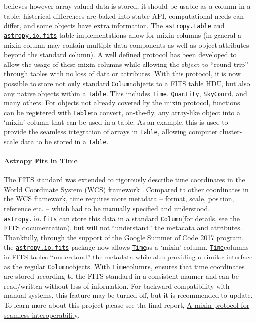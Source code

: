 \documentclass[modern]{aastex631}
\newcommand{\astropysubpkg}[1]{\href{http://docs.astropy.org/en/stable/#1/index.html}{\texttt{astropy.#1}}\xspace}
\newcommand{\astropyiosubpkg}[1]{\href{http://docs.astropy.org/en/stable/io/#1/index.html}{\texttt{astropy.io.#1}}\xspace}
\newcommand{\astropytable}{\astropysubpkg{table}}
\newcommand{\astropyfits}{\astropyiosubpkg{fits}}
\newcommand{\astropyapi}[2]{\href{https://docs.astropy.org/en/stable/api/astropy.#1.html}{#2}}
\newcommand{\astropyapidoc}[2]{\astropyapi{#1}{\texttt{#2}\xspace}}
\newcommand{\astropySkyCoord}{\astropyapidoc{coordinates.SkyCoord}{SkyCoord}}
\newcommand{\astropyFitsColumn}{\astropyapidoc{io.fits.Column}{Column}}
\newcommand{\astropyTableColumn}{\astropyapidoc{table.Column}{Column}}
\newcommand{\astropyTable}{\astropyapidoc{table.Table}{Table}}
\newcommand{\astropyTime}{\astropyapidoc{time.Time}{Time}}
\newcommand{\astropyQuantity}{\astropyapidoc{units.Quantity}{Quantity}}
\begin{document}
    \astropy believes however array-valued data is stored, it should be usable
    as a column in a table: historical differences are baked into stable API,
    computational needs can differ, and some objects have extra information. The
    \astropytable and \astropyfits table implementations allow for mixin-columns
    (in general a mixin column may contain multiple data components as well as
    object attributes beyond the standard column). A well defined protocol has
    been developed to allow the usage of these mixin columns while allowing the
    object to ``round-trip'' through tables with no loss of data or attributes.
    With this protocol, it is now possible to store not only standard
    \astropyTableColumn objects to a FITS table
    \href{https://docs.astropy.org/en/stable/io/fits/api/hdus.html}{HDU}, but
    also any \astropy native objects within a \astropyTable. This includes
    \astropyTime, \astropyQuantity, \astropySkyCoord, and many others. For
    objects not already covered by the mixin protocol, functions can be
    registered with \astropyTable to convert, on-the-fly, any array-like object
    into a `mixin' column that can be used in a table. As an example, this is
    used to provide the seamless integration of  arrays in
    \astropyTable, allowing computer cluster-scale data to be stored in a
    \astropyTable.

  \paragraph{Astropy Fits in Time}

    The FITS standard was extended to rigorously describe time coordinates in
    the World Coordinate System (WCS) framework \citep{FITS-Time:2015}. Compared
    to other coordinates in the WCS framework, time requires more metadata --
    format, scale, position, reference etc. -- which had to be manually
    specified and understood. \astropyfits can store this data in a standard
    \astropyFitsColumn (for details, see the
    \href{https://docs.astropy.org/en/stable/io/fits/index.html}{FITS
    documentation}), but will not ``understand'' the metadata and attributes.
    Thankfully, through the support of the
    \href{https://summerofcode.withgoogle.com/archive/2017/projects/4778482366152704}{Google
    Summer of Code} 2017 program, the \astropyfits package now allows
    \astropyTime as a `mixin' column. \astropyTime columns in FITS tables
    ``understand'' the metadata while also providing a similar interface as the
    regular \astropyFitsColumn objects. With \astropyTime columns, \astropy
    ensures that time coordinates are stored according to the FITS standard in a
    consistent manner and can be read/written without loss of information. For
    backward compatibility with manual systems, this feature may be turned off,
    but it is recommended to update. To learn more about this project please see
    the final report,
    \href{https://aaryapatil.wordpress.com/2017/08/28/a-mixin-protocol-for-seamless-interoperability/}{A
    mixin protocol for seamless interoperability}.
\end{document}
